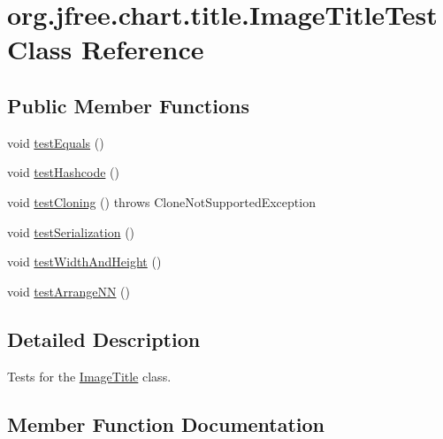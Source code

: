 \hypertarget{classorg_1_1jfree_1_1chart_1_1title_1_1_image_title_test}{}\section{org.\+jfree.\+chart.\+title.\+Image\+Title\+Test Class Reference}
\label{classorg_1_1jfree_1_1chart_1_1title_1_1_image_title_test}
\subsection*{Public Member Functions}
\begin{DoxyCompactItemize}
\item 
void \mbox{\hyperlink{classorg_1_1jfree_1_1chart_1_1title_1_1_image_title_test_a65f586167e1ea630355ff62eb020efc5}{test\+Equals}} ()
\item 
void \mbox{\hyperlink{classorg_1_1jfree_1_1chart_1_1title_1_1_image_title_test_a20262ee3e26cb0504073980cb1fbb9d3}{test\+Hashcode}} ()
\item 
void \mbox{\hyperlink{classorg_1_1jfree_1_1chart_1_1title_1_1_image_title_test_a9b40e4dad2f1641f6e95182c90b63a7a}{test\+Cloning}} ()  throws Clone\+Not\+Supported\+Exception 
\item 
void \mbox{\hyperlink{classorg_1_1jfree_1_1chart_1_1title_1_1_image_title_test_afdb456edce541c0a45247d4f363f90c2}{test\+Serialization}} ()
\item 
void \mbox{\hyperlink{classorg_1_1jfree_1_1chart_1_1title_1_1_image_title_test_a7c53d4e1e182d11cbe39d6186854d676}{test\+Width\+And\+Height}} ()
\item 
void \mbox{\hyperlink{classorg_1_1jfree_1_1chart_1_1title_1_1_image_title_test_ac34a540ea88454342a020d69630dc05e}{test\+Arrange\+NN}} ()
\end{DoxyCompactItemize}


\subsection{Detailed Description}
Tests for the \mbox{\hyperlink{classorg_1_1jfree_1_1chart_1_1title_1_1_image_title}{Image\+Title}} class. 

\subsection{Member Function Documentation}
\mbox{\label{classorg_1_1jfree_1_1chart_1_1title_1_1_image_title_test_ac34a540ea88454342a020d69630dc05e}} 
